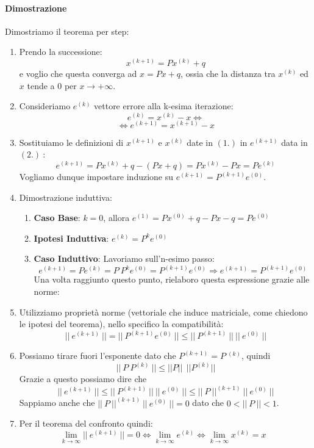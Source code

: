\documentclass{article}
\begin{document}
\paragraph{Dimostrazione} Dimostriamo il teorema per step:

\begin{enumerate}
    \item Prendo la successione:
    \[ x^{(k+1)} = Px^{(k)} + q \]
    e voglio che questa converga ad $x=Px+q$, ossia che la distanza tra $x^{(k)}$ ed $x$ tende a $0$ per $x \rightarrow +\infty$.
    \vspace*{15px}
    \item Consideriamo $e^{(k)}$ vettore errore alla k-esima iterazione:
    \[ e^{(k)} = x^{(k)} - x  \Leftrightarrow \]
    \[ \Leftrightarrow e^{(k+1)} = x^{(k+1)} - x \]
    \vspace*{15px}
    \item Sostituiamo le definizioni di $x^{(k+1)}$ e $x^{(k)}$ date in $(1.)$ in $e^{(k+1)}$ data in $(2.)\:$:
    \[ e^{(k+1)} = Px^{(k)} + q - (Px+q) = Px^{(k)} - Px = Pe^{(k)} \]
    \vspace*{15px}
    Vogliamo dunque impostare induzione su $\boxed{e^{(k+1)} = P^{(k+1)}e^{(0)}}$.
    \newpage
    \item Dimostrazione induttiva:
    \begin{enumerate}
        \item \textbf{Caso Base}: $k=0$, allora $e^{(1)} = Px^{(0)} + q - Px - q = Pe^{(0)}$ 
        \item \textbf{Ipotesi Induttiva}: $ \boxed{e^{(k)} = P^{k}e^{(0)}} $
        \item \textbf{Caso Induttivo}: Lavoriamo sull'n-esimo passo:
        \[ e^{(k+1)} = Pe^{(k)} = P \: P^{k} e^{(0)} = P^{(k+1)} e^{(0)} \Rightarrow e^{(k+1)} = P^{(k+1)}e^{(0)} \]
        Una volta raggiunto questo punto, rielaboro questa espressione grazie alle norme:
    \end{enumerate}
    \item Utilizziamo proprietà norme (vettoriale che induce matriciale, come chiedono le ipotesi del teorema), nello specifico la compatibilità:
    \[ ||\: e^{(k+1)} \:|| = ||\: P^{(k+1)} e^{(0)} \:|| \leq ||\: P^{(k+1)} \:|| \: ||\: e^{(0)} \:|| \]
    \item Possiamo tirare fuori l'esponente dato che $P^{(k+1)} = P\:^{(k)} $, quindi 
    \[ ||\: P \: P^{(k)} \:|| \leq ||P|| \:\: ||P^{(k)}|| \]
    Grazie a questo possiamo dire che
    \[ ||\: e^{(k+1)} \:|| \leq ||\: P^{(k+1)} \:|| \: ||\: e^{(0)} \:|| \leq ||\: P \:||^{(k+1)} \: ||\: e^{(0)} \:||\]
    Sappiamo anche che $||\: P \:||^{(k+1)} \: ||\: e^{(0)} \:|| = 0$ dato che $0 < ||\:P\:|| < 1 $.
    \item Per il teorema del confronto quindi:
    \[ \lim_{k \rightarrow \infty} ||\: e^{(k+1)} \:|| = 0 \Longleftrightarrow \lim_{k \rightarrow \infty} e^{(k)} \Longleftrightarrow \lim_{k \rightarrow \infty} x^{(k)} = x \:\:\: \boxed{} \] 
\end{enumerate}
\end{document}
